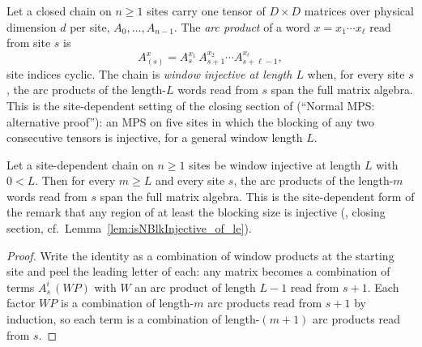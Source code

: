 \begin{definition}%
    \label{def:chain_arc_window_injective}
    \leanok
    Let a closed chain on $n \ge 1$ sites carry one tensor of $D \times D$
    matrices over physical dimension $d$ per site, $A_0, \dots, A_{n-1}$.
    The \emph{arc product} of a word $x = x_1 \cdots x_\ell$ read from
    site $s$ is
    \[
        A_{(s)}^{x} = A_{s}^{x_1}\, A_{s+1}^{x_2} \cdots
        A_{s+\ell-1}^{x_\ell},
    \]
    site indices cyclic.  The chain is \emph{window injective at length
        $L$} when, for every site $s$, the arc products of the length-$L$
    words read from $s$ span the full matrix algebra.  This is the
    site-dependent setting of the closing section of
    \cite{Molnar2018NormalPEPS} (``Normal MPS: alternative proof''): an
    MPS on five sites in which the blocking of any two consecutive tensors
    is injective, for a general window length $L$.
\end{definition}

\begin{lemma}%
    \label{lem:isWindowInjective_arc_span}
    \leanok
    Let a site-dependent chain on $n \ge 1$ sites be window injective at
    length $L$ with $0 < L$.  Then for every $m \ge L$ and every site $s$,
    the arc products of the length-$m$ words read from $s$ span the full
    matrix algebra.  This is the site-dependent form of the remark that
    any region of at least the blocking size is injective
    (\cite{Molnar2018NormalPEPS}, closing section,
    cf.\ Lemma~\ref{lem:isNBlkInjective_of_le}).
\end{lemma}
\begin{proof}\leanok
    Write the identity as a combination of window products at the starting
    site and peel the leading letter of each: any matrix becomes a
    combination of terms $A_s^{i}\,(W P)$ with $W$ an arc product of
    length $L - 1$ read from $s + 1$.  Each factor $W P$ is a combination
    of length-$m$ arc products read from $s + 1$ by induction, so each
    term is a combination of length-$(m+1)$ arc products read from $s$.
\end{proof}

